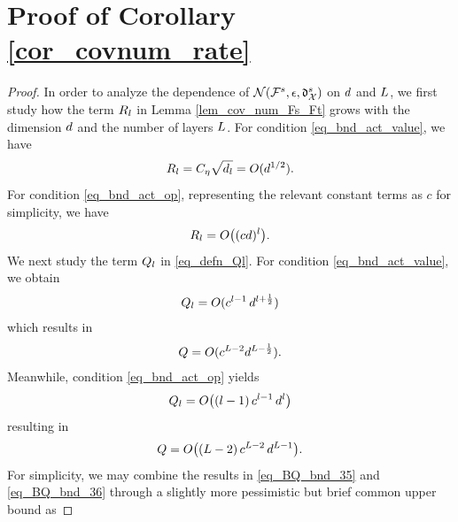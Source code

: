 \documentclass[review,supplement,onefignum,onetabnum]{siamonline250211}
\begin{document}
\clearpage



\section{Proof of Corollary \ref{cor_covnum_rate}}
\label{pf_cor_covnum_rate}

\begin{proof}
In order to analyze the dependence of $\mathcal{N} (  \mathcal{F}^s, \epsilon, \mathfrak{d}^s_{\mathcal{X}} ) $ on ${d}$ and $L$, we first study how the term ${R_l}$ in Lemma \ref{lem_cov_num_Fs_Ft} grows with the dimension ${d}$ and the number of layers $L$.
For condition \eqref{eq_bnd_act_value}, we have 
%
\[
{R_l} ={C_\eta} \sqrt{{d_l}} = O({d}^{1/2}).
\]
%
For condition \eqref{eq_bnd_act_op}, representing the relevant constant terms as $c$ for simplicity, we have
%
\begin{equation*}
\begin{split}
{R_l} = O\big( (c{d})^{l} \big).
\end{split}
\end{equation*}
%
We next study the term ${Q_l}$ in \eqref{eq_defn_Ql}. For condition  \eqref{eq_bnd_act_value}, we obtain
%
\begin{equation*}
\begin{split}
{Q_l} = O( c^{l-1} \, {d}^{l+ \frac{1}{2}})
\end{split}
\end{equation*}
%
which results in
%
\begin{equation}
\label{eq_BQ_bnd_35}
\begin{split}
{Q} = O(c^{L-2} {d}^{L-\frac{1}{2}}).
\end{split}
\end{equation}
%
Meanwhile, condition \eqref{eq_bnd_act_op} yields
%
\begin{equation*}
\begin{split}
{Q_l} = O\big( (l-1) \, c^{l-1} \,  {d}^{l} \big)
\end{split}
\end{equation*}
%
resulting in
%
\begin{equation}
\label{eq_BQ_bnd_36}
\begin{split}
{Q} = O\big( (L-2) \, c^{L-2} \,  {d}^{L-1} \big).
\end{split}
\end{equation}
%
For simplicity, we may combine the results in \eqref{eq_BQ_bnd_35} and \eqref{eq_BQ_bnd_36} through a slightly more pessimistic but brief common upper bound as

\end{proof}
\end{document}
